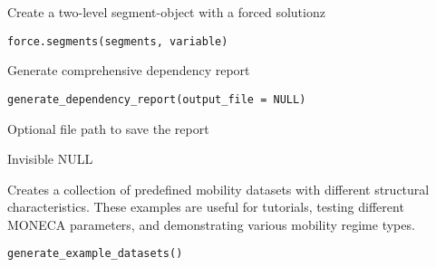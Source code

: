 \documentclass[a4paper]{book}
\begin{document}
%
\begin{Description}
Create a two-level segment-object with a forced solutionz
\end{Description}
%
\begin{Usage}
\begin{verbatim}
force.segments(segments, variable)
\end{verbatim}
\end{Usage}
%
\begin{Description}
Generate comprehensive dependency report
\end{Description}
%
\begin{Usage}
\begin{verbatim}
generate_dependency_report(output_file = NULL)
\end{verbatim}
\end{Usage}
%
\begin{Arguments}
\begin{ldescription}
\item[\code{output\_file}] Optional file path to save the report
\end{ldescription}
\end{Arguments}
%
\begin{Value}
Invisible NULL
\end{Value}
%
\begin{Description}
Creates a collection of predefined mobility datasets with different structural
characteristics. These examples are useful for tutorials, testing different
MONECA parameters, and demonstrating various mobility regime types.
\end{Description}
%
\begin{Usage}
\begin{verbatim}
generate_example_datasets()
\end{verbatim}
\end{Usage}
%
\end{document}
